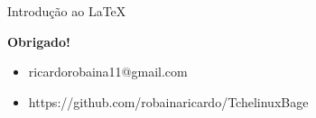 \documentclass{beamer}
\begin{document}
\begin{frame}{Introdução ao \LaTeX}
	
		\newline
		\begin{center}
			{\Huge  \textbf{Obrigado!} \\}
		\end{center}
		
		{\normalsize 
			\begin{itemize}
				\item ricardorobaina11@gmail.com 
				\item https://github.com/robainaricardo/TchelinuxBage \\ \newline   
			\end{itemize}	
		}
		\maketitle
	
\end{frame}
\end{document}
